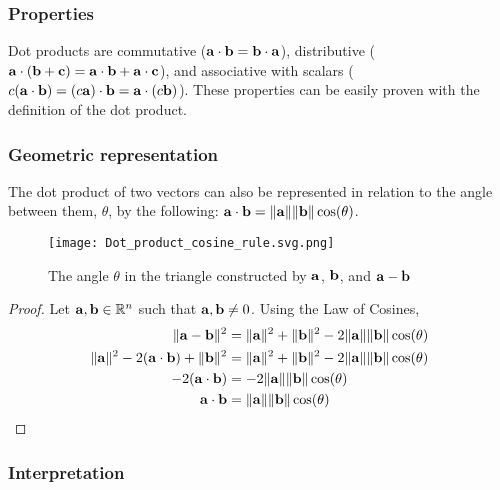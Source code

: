 \documentclass[../main.tex]{subfiles}
\begin{document}
\subsubsection{Properties}

Dot products are commutative ($\mathbf{a} \cdot \mathbf{b} = \mathbf{b} \cdot \mathbf{a}$),
distributive ($\mathbf{a} \cdot (\mathbf{b} + \mathbf{c}) = \mathbf{a} \cdot \mathbf{b} + \mathbf{a} \cdot \mathbf{c}$),
and associative with scalars ($c(\mathbf{a} \cdot \mathbf{b}) = (c\mathbf{a}) \cdot \mathbf{b} = \mathbf{a} \cdot (c\mathbf{b})$).
These properties can be easily proven with the definition of the dot product.

\subsubsection{Geometric representation}

The dot product of two vectors can also
be represented in relation to the angle between them, $\theta$, by
the following: $\mathbf{a} \cdot \mathbf{b} = \|\mathbf{a}\| \|\mathbf{b}\| \cos (\theta)$.

\begin{figure}[H]
	\centering
	\texttt{[image: Dot\_product\_cosine\_rule.svg.png]}
	\caption{The angle $\theta$ in the triangle constructed
		by $\mathbf{a}$, $\mathbf{b}$, and $\mathbf{a} - \mathbf{b}$}
\end{figure}

\begin{proof}
	Let $\mathbf{a}, \mathbf{b} \in \mathbb{R}^n$ such that $\mathbf{a}, \mathbf{b} \neq 0$. Using the Law of Cosines,
	\begin{align*}
		\|\mathbf{a}-\mathbf{b}\|^2                                    & = \|\mathbf{a}\|^2 + \|\mathbf{b}\|^2 - 2\|\mathbf{a}\| \|\mathbf{b}\| \cos (\theta) \\
		\|\mathbf{a}\|^2 - 2(\mathbf{a}\cdot\mathbf{b}) + \|\mathbf{b}\|^2 & = \|\mathbf{a}\|^2+\|\mathbf{b}\|^2-2\|\mathbf{a}\|\|\mathbf{b}\|\cos (\theta)       \\
		-2(\mathbf{a}\cdot\mathbf{b})                                  & =-2\|\mathbf{a}\|\|\mathbf{b}\|\cos (\theta)                                     \\
		\mathbf{a}\cdot\mathbf{b}                                      & =\|\mathbf{a}\|\|\mathbf{b}\|\cos (\theta)                                       \\
	\end{align*}
\end{proof}

\subsubsection{Interpretation}
\end{document}

